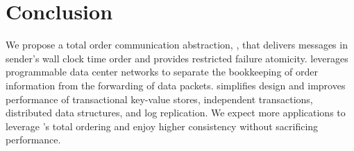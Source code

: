 \section{Conclusion}
\label{sec:conclusion}

We propose a total order communication abstraction, \sys{}, that delivers messages in sender's wall clock time order and provides restricted failure atomicity. 
\sys{} leverages programmable data center networks to separate the bookkeeping of order information from the forwarding of data packets.
\sys{} simplifies design and improves performance of transactional key-value stores, independent transactions, distributed data structures, and log replication.
We expect more applications to leverage \sys{}'s total ordering and enjoy higher consistency without sacrificing performance.